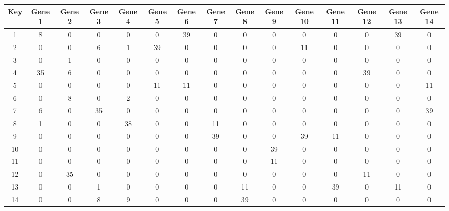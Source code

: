 \begin{tabular}{|c|c|c|c|c|c|c|c|c|c|c|c|c|c|c|}
\hline
Key & Gene 1 & Gene 2 & Gene 3 & Gene 4 & Gene 5 & Gene 6 & Gene 7 & Gene 8 & Gene 9 & Gene 10 & Gene 11 & Gene 12 & Gene 13 & Gene 14 \\
\hline
1 & 8 & 0 & 0 & 0 & 0 & 39 & 0 & 0 & 0 & 0 & 0 & 0 & 39 & 0 \\
2 & 0 & 0 & 6 & 1 & 39 & 0 & 0 & 0 & 0 & 11 & 0 & 0 & 0 & 0 \\
3 & 0 & 1 & 0 & 0 & 0 & 0 & 0 & 0 & 0 & 0 & 0 & 0 & 0 & 0 \\
4 & 35 & 6 & 0 & 0 & 0 & 0 & 0 & 0 & 0 & 0 & 0 & 39 & 0 & 0 \\
5 & 0 & 0 & 0 & 0 & 11 & 11 & 0 & 0 & 0 & 0 & 0 & 0 & 0 & 11 \\
6 & 0 & 8 & 0 & 2 & 0 & 0 & 0 & 0 & 0 & 0 & 0 & 0 & 0 & 0 \\
7 & 6 & 0 & 35 & 0 & 0 & 0 & 0 & 0 & 0 & 0 & 0 & 0 & 0 & 39 \\
8 & 1 & 0 & 0 & 38 & 0 & 0 & 11 & 0 & 0 & 0 & 0 & 0 & 0 & 0 \\
9 & 0 & 0 & 0 & 0 & 0 & 0 & 39 & 0 & 0 & 39 & 11 & 0 & 0 & 0 \\
10 & 0 & 0 & 0 & 0 & 0 & 0 & 0 & 0 & 39 & 0 & 0 & 0 & 0 & 0 \\
11 & 0 & 0 & 0 & 0 & 0 & 0 & 0 & 0 & 11 & 0 & 0 & 0 & 0 & 0 \\
12 & 0 & 35 & 0 & 0 & 0 & 0 & 0 & 0 & 0 & 0 & 0 & 11 & 0 & 0 \\
13 & 0 & 0 & 1 & 0 & 0 & 0 & 0 & 11 & 0 & 0 & 39 & 0 & 11 & 0 \\
14 & 0 & 0 & 8 & 9 & 0 & 0 & 0 & 39 & 0 & 0 & 0 & 0 & 0 & 0 \\
\hline
\end{tabular}